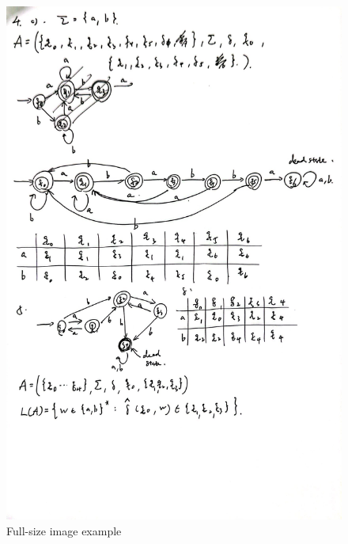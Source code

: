 \documentclass[12pt]{article}
\begin{document}
\begin{figure}[htbp]
    \centering
    \includegraphics[width=\textwidth]{Tut1/4c.jpg}
    \caption{Full-size image example}
    \label{fig:fullsize}
\end{figure}
\newpage
\end{document}
